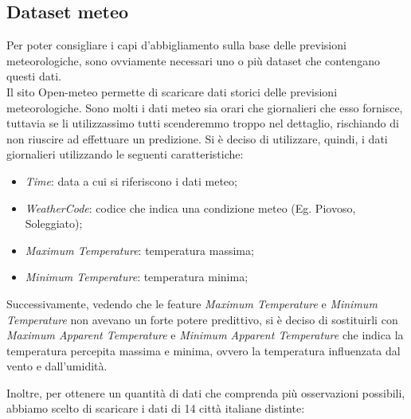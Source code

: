 \documentclass[a4paper, 11pt, oneside]{report}
\begin{document}
                \subsection{Dataset meteo}
                Per poter consigliare i capi d'abbigliamento sulla base delle previsioni meteorologiche, sono ovviamente necessari
                uno o più dataset che contengano questi dati.\\
                Il sito Open-meteo \cite{9} permette di scaricare dati storici delle previsioni meteorologiche.
                Sono molti i dati meteo sia orari che giornalieri che esso fornisce, tuttavia se li utilizzassimo tutti
                scenderemmo troppo nel dettaglio, rischiando di non riuscire ad effettuare un predizione.
                Si è deciso di utilizzare, quindi, i dati giornalieri utilizzando le seguenti caratteristiche:
                \begin{itemize}
                    \item \emph{Time}: data a cui si riferiscono i dati meteo;
                    \item \emph{WeatherCode}: codice che indica una condizione meteo (Eg. Piovoso, Soleggiato);
                    \item \emph{Maximum Temperature}: temperatura massima;
                    \item \emph{Minimum Temperature}: temperatura minima;
                \end{itemize}
                Successivamente, vedendo che le feature \emph{Maximum Temperature} e \emph{Minimum Temperature} non avevano un
                forte potere predittivo, si è deciso di sostituirli con \emph{Maximum Apparent Temperature}
                e \emph{Minimum Apparent Temperature} che indica la temperatura percepita massima e minima,
                ovvero la temperatura influenzata dal vento e dall'umidità.
                \\
                \par \noindent Inoltre, per ottenere un quantità di dati che comprenda più osservazioni possibili, abbiamo scelto di scaricare i dati di
                14 città italiane distinte:
\end{document}
